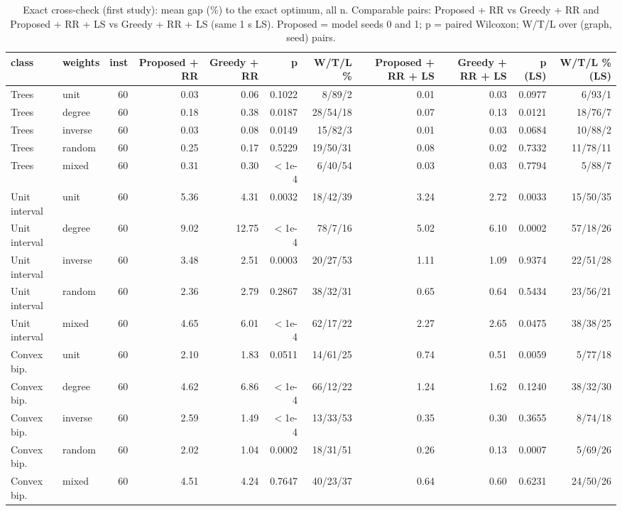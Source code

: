 \begin{table}[t]
\centering
\caption{Exact cross-check (first study): mean gap (\%) to the exact optimum, all n. Comparable pairs: Proposed + RR vs Greedy + RR and Proposed + RR + LS vs Greedy + RR + LS (same 1 s LS). Proposed = model seeds 0 and 1; p = paired Wilcoxon; W/T/L over (graph, seed) pairs.}
\label{tab:exact_fair_first}
\scriptsize
\begin{tabular}{llrrrrrrrrr}
\toprule
class & weights & inst & Proposed + RR & Greedy + RR & p & W/T/L \% & Proposed + RR + LS & Greedy + RR + LS & p (LS) & W/T/L \% (LS) \\
\midrule
Trees & unit & 60 & 0.03 & 0.06 & 0.1022 & 8/89/2 & 0.01 & 0.03 & 0.0977 & 6/93/1 \\
Trees & degree & 60 & 0.18 & 0.38 & 0.0187 & 28/54/18 & 0.07 & 0.13 & 0.0121 & 18/76/7 \\
Trees & inverse & 60 & 0.03 & 0.08 & 0.0149 & 15/82/3 & 0.01 & 0.03 & 0.0684 & 10/88/2 \\
Trees & random & 60 & 0.25 & 0.17 & 0.5229 & 19/50/31 & 0.08 & 0.02 & 0.7332 & 11/78/11 \\
Trees & mixed & 60 & 0.31 & 0.30 & $<$1e-4 & 6/40/54 & 0.03 & 0.03 & 0.7794 & 5/88/7 \\
Unit interval & unit & 60 & 5.36 & 4.31 & 0.0032 & 18/42/39 & 3.24 & 2.72 & 0.0033 & 15/50/35 \\
Unit interval & degree & 60 & 9.02 & 12.75 & $<$1e-4 & 78/7/16 & 5.02 & 6.10 & 0.0002 & 57/18/26 \\
Unit interval & inverse & 60 & 3.48 & 2.51 & 0.0003 & 20/27/53 & 1.11 & 1.09 & 0.9374 & 22/51/28 \\
Unit interval & random & 60 & 2.36 & 2.79 & 0.2867 & 38/32/31 & 0.65 & 0.64 & 0.5434 & 23/56/21 \\
Unit interval & mixed & 60 & 4.65 & 6.01 & $<$1e-4 & 62/17/22 & 2.27 & 2.65 & 0.0475 & 38/38/25 \\
Convex bip. & unit & 60 & 2.10 & 1.83 & 0.0511 & 14/61/25 & 0.74 & 0.51 & 0.0059 & 5/77/18 \\
Convex bip. & degree & 60 & 4.62 & 6.86 & $<$1e-4 & 66/12/22 & 1.24 & 1.62 & 0.1240 & 38/32/30 \\
Convex bip. & inverse & 60 & 2.59 & 1.49 & $<$1e-4 & 13/33/53 & 0.35 & 0.30 & 0.3655 & 8/74/18 \\
Convex bip. & random & 60 & 2.02 & 1.04 & 0.0002 & 18/31/51 & 0.26 & 0.13 & 0.0007 & 5/69/26 \\
Convex bip. & mixed & 60 & 4.51 & 4.24 & 0.7647 & 40/23/37 & 0.64 & 0.60 & 0.6231 & 24/50/26 \\

\end{tabular}
\end{table}
